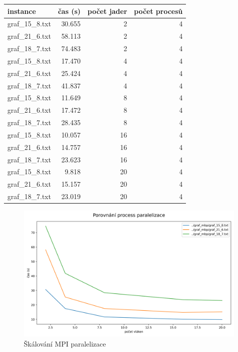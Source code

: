 \FloatBarrier
\begin{table}[]
    \begin{tabular}{l|rrr}
                    instance &   čas (s) &  počet jader &  počet procesů \\
    \hline
    graf\_15\_8.txt & 30.655 &           2 &         4 \\
    graf\_21\_6.txt & 58.113 &           2 &         4 \\
    graf\_18\_7.txt & 74.483 &           2 &         4 \\
    graf\_15\_8.txt & 17.470 &           4 &         4 \\
    graf\_21\_6.txt & 25.424 &           4 &         4 \\
    graf\_18\_7.txt & 41.837 &           4 &         4 \\
    graf\_15\_8.txt & 11.649 &           8 &         4 \\
    graf\_21\_6.txt & 17.472 &           8 &         4 \\
    graf\_18\_7.txt & 28.435 &           8 &         4 \\
    graf\_15\_8.txt & 10.057 &          16 &         4 \\
    graf\_21\_6.txt & 14.757 &          16 &         4 \\
    graf\_18\_7.txt & 23.623 &          16 &         4 \\
    graf\_15\_8.txt &  9.818 &          20 &         4 \\
    graf\_21\_6.txt & 15.157 &          20 &         4 \\
    graf\_18\_7.txt & 23.019 &          20 &         4 \\
    \end{tabular}
\end{table}
\FloatBarrier


\begin{figure}[!htbp]
\centerline{\includegraphics[scale=.46]{images/porovnání_process_paralelizace.png}}
\caption{Škálování MPI paralelizace}
\end{figure}